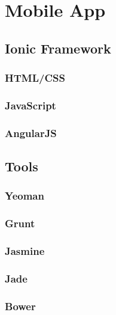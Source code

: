 \section{Mobile App} %
\subsection{Ionic Framework}
\subsubsection{HTML/CSS}

\subsubsection{JavaScript}

\subsubsection{AngularJS}


\subsection{Tools}
\subsubsection{Yeoman}

\subsubsection{Grunt}

\subsubsection{Jasmine}

\subsubsection{Jade}

\subsubsection{Bower}

